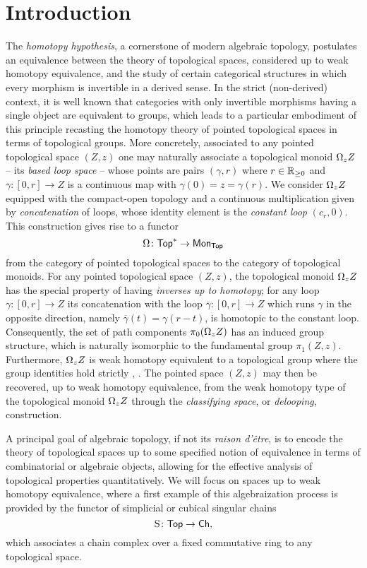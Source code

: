 
\section{Introduction}

The \textit{homotopy hypothesis}, a cornerstone of modern algebraic topology, postulates an equivalence between the theory of topological spaces, considered up to weak homotopy equivalence, and the study of certain categorical structures in which every morphism is invertible in a derived sense.
In the strict (non-derived) context, it is well known that categories with only invertible morphisms having a single object are equivalent to groups, which leads to a particular embodiment of this principle recasting the homotopy theory of pointed topological spaces in terms of topological groups.
More concretely, associated to any pointed topological space $(Z,z)$ one may naturally associate a topological monoid $\Omega_z Z$ -- its \textit{based loop space} -- whose points are pairs $(\gamma, r)$ where $r \in \mathbb{R}_{\geq 0}$ and $\gamma \colon [0,r] \to Z$ is a continuous map with $\gamma(0) = z = \gamma(r)$.
We consider $\Omega_z Z$  equipped with the compact-open topology and a continuous multiplication given by \textit{concatenation} of loops, whose identity element is the \textit{constant loop} $(c_r,0)$.
This construction gives rise to a functor
\[
\Omega \colon \mathsf{Top}^{\ast} \to \mathsf{Mon}_{\mathsf{Top}}
\]
from the category of pointed topological spaces to the category of topological monoids.
For any pointed topological space $(Z,z)$, the topological monoid $\Omega_z Z$ has the special property of having \textit{inverses up to homotopy}; for any loop $\gamma \colon [0,r] \to Z $ its concatenation with the loop $\overline{\gamma} \colon [0,r] \to Z$ which runs $\gamma$ in the opposite direction, namely $\overline{\gamma}(t) = \gamma(r-t)$, is homotopic to the constant loop.
Consequently, the set of path components $\pi_0(\Omega_z Z)$ has an induced group structure, which is naturally isomorphic to the fundamental group $\pi_1(Z,z)$.
Furthermore, $\Omega_z Z$ is weak homotopy equivalent to a topological group where the group identities hold strictly \cite{milnor1956bundles}, \cite{berger1995loops}.
The pointed space $(Z,z)$ may then be recovered, up to weak homotopy equivalence, from the weak homotopy type of the topological monoid $\Omega_z Z$ through the \textit{classifying space}, or \textit{delooping}, construction.

A principal goal of algebraic topology, if not its \textit{raison d'\^{e}tre}, is to encode the theory of topological spaces up to some specified notion of equivalence in terms of combinatorial or algebraic objects, allowing for the effective analysis of topological properties quantitatively.
We will focus on spaces up to weak homotopy equivalence, where a first example of this algebraization process is provided by the functor of simplicial or cubical singular chains
\[
\operatorname{S} \colon \mathsf{Top} \to \mathsf{Ch},
\]
which associates a chain complex over a fixed commutative ring to any topological space.

